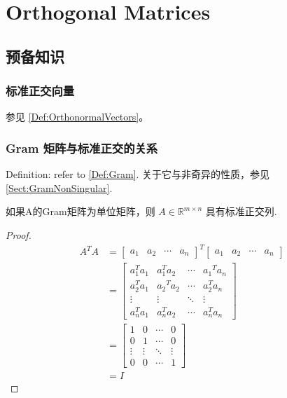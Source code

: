 \chapter{Orthogonal Matrices}

\section{预备知识}

\subsection{标准正交向量}

参见 \ref{Def:OrthonormalVectors}。

\subsection{Gram 矩阵与标准正交的关系}

Definition: refer to \ref{Def:Gram}. 关于它与非奇异的性质，参见 \ref{Sect:GramNonSingular}.

\begin{theorem}
    如果A的Gram矩阵为单位矩阵，则 $ A \in \mathbb{R}^{m \times n} $ 具有标准正交列.
\end{theorem}

\begin{proof}
    $$ \begin{aligned} A^{T} A&=\left[\begin{array}{llll}a_{1} & a_{2} & \cdots & a_{n}\end{array}\right]^{T}\left[\begin{array}{llll}a_{1} & a_{2} & \cdots & a_{n}\end{array}\right] 
    \\ &=\left[\begin{array}{cccc}a_{1}^{T} a_{1} & a_{1}^{T} a_{2} & \cdots & a_{1}{ }^{T} a_{n} \\ a_{2}^{T} a_{1} & a_{2}{ }^{T} a_{2} & \cdots & a_{2}^{T} a_{n} \\ \vdots & \vdots & \ddots & \vdots \\ a_{n}^{T} a_{1} & a_{n}^{T} a_{2} & \cdots & a_{n}^{T} a_{n}\end{array}\right] 
    \\  &=\left[\begin{array}{cccc}1 & 0 & \cdots & 0 \\ 0 & 1 & \cdots & 0 \\ \vdots & \vdots & \ddots & \vdots \\ 0 & 0 & \cdots & 1\end{array}\right] 
    \\ & =I  \end{aligned} $$
\end{proof}

